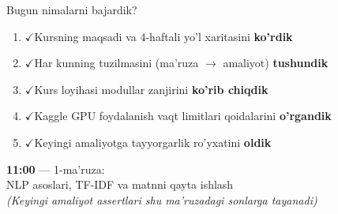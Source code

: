 \documentclass[aspectratio=169,11pt]{beamer}
\newcommand{\bajarildi}{{\color{deepgreen}\large$\checkmark$}\;}
\begin{document}
\begin{frame}{Bugun nimalarni bajardik?}
  \begin{enumerate}\setlength\itemsep{8pt}
    \item \bajarildi Kursning maqsadi va 4-haftali yo'l xaritasini \textbf{ko'rdik}
    \item \bajarildi Har kunning tuzilmasini (ma'ruza $\to$ amaliyot) \textbf{tushundik}
    \item \bajarildi Kurs loyihasi modullar zanjirini \textbf{ko'rib chiqdik}
    \item \bajarildi Kaggle GPU foydalanish vaqt limitlari qoidalarini \textbf{o'rgandik}
    \item \bajarildi Keyingi amaliyotga tayyorgarlik ro'yxatini \textbf{oldik}
  \end{enumerate}
  \vspace{0.5em}
  \begin{center}
    \begin{tcolorbox}[okbox,title=Keyingi qadam]
      \centering
      \textbf{11:00} --- 1-ma'ruza:\\
      NLP asoslari, TF-IDF va matnni qayta ishlash\\[4pt]
      \textit{(Keyingi amaliyot assertlari shu ma'ruzadagi sonlarga tayanadi)}
    \end{tcolorbox}
  \end{center}
\end{frame}
\end{document}
